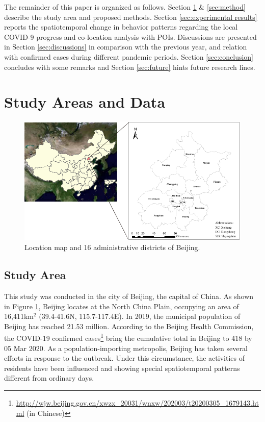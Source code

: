\documentclass[ijgi,submit,moreauthors,pdftex]{Definitions/mdpi}
\begin{document}
The remainder of this paper is organized as follows. 
Section \ref{sec:data} \& \ref{sec:method} describe the study area and proposed methods.
Section \ref{sec:experimental results} reports the spatiotemporal change in behavior patterns regarding the local COVID-9 progress and co-location analysis with POIs.
Discussions are presented in Section \ref{sec:discussions} in comparison with the previous year, and relation with confirmed cases during different pandemic periods.
Section \ref{sec:conclusion} concludes with some remarks and Section \ref{sec:future} hints future research lines.


\section{Study Areas and Data}\label{sec:data}

\begin{figure}[ht]
    \centering
    \includegraphics[width=\textwidth]{Figures/StudyArea.pdf}
    \caption{Location map and 16 administrative districts of Beijing.}
    \label{fig:study_area}
\end{figure}

\subsection{Study Area}
This study was conducted in the city of Beijing, the capital of China.
As shown in Figure \ref{fig:study_area}, Beijing locates at the North China Plain, occupying an area of 16,411km$^2$ (39.4{\degree}-41.6{\degree}N, 115.7{\degree}-117.4{\degree}E).
In 2019, the municipal population of Beijing has reached 21.53 million. According to the Beijing Health Commission, the COVID-19 confirmed cases\footnote{\url{http://wjw.beijing.gov.cn/xwzx_20031/wnxw/202003/t20200305_1679143.html} (in Chinese)} bring the cumulative total in Beijing to 418 by 05 Mar 2020.
As a population-importing metropolis, Beijing has taken several efforts in response to the outbreak. 
Under this circumstance, the activities of residents have been influenced and showing special spatiotemporal patterns different from ordinary days.
\end{document}
